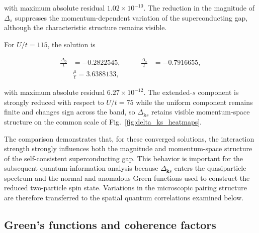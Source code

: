 \documentclass[aps,prb,twocolumn,superscriptaddress,longbibliography]{revtex4-2}
\begin{document}
with maximum absolute residual $1.02\times10^{-10}$. The reduction in the
magnitude of $\Delta_s$ suppresses the momentum-dependent variation of the
superconducting gap, although the characteristic structure remains visible.

For $U/t=115$, the solution is

\begin{equation}\boxed{
\begin{aligned}
\frac{\Delta_0}{t}&=-0.2822545,
&\qquad \frac{\Delta_s}{t}&=-0.7916655,\\
&\frac{\mu}{t}=3.6388133,
\end{aligned}
}\end{equation}

with maximum absolute residual $6.27\times10^{-12}$. The extended-$s$
component is strongly reduced with respect to $U/t=75$ while the uniform
component remains finite and changes sign across the band, so
$\Delta_{\mathbf{k}s}$ retains visible momentum-space structure on the
common scale of Fig.~\ref{fig:delta_ks_heatmaps}.

The comparison demonstrates that, for these converged solutions, the
interaction strength strongly influences both the magnitude and
momentum-space structure of the self-consistent superconducting gap. This
behavior is important for the subsequent quantum-information analysis
because $\Delta_{\mathbf{k}s}$ enters the quasiparticle spectrum and the
normal and anomalous Green functions used to construct the reduced
two-particle spin state. Variations in the microscopic pairing structure are
therefore transferred to the spatial quantum correlations examined below.

\subsection{Green's functions and coherence factors}
\label{sec:greens}
\end{document}
